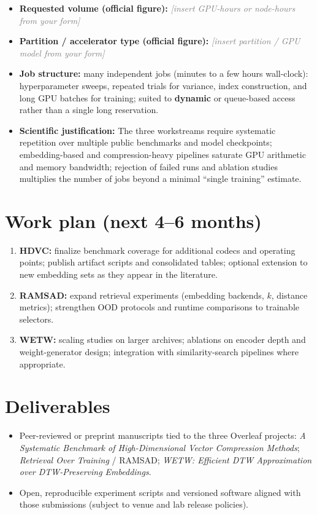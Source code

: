 \documentclass[11pt,a4paper]{article}
\newcommand{\AllocHours}{\textit{\textcolor{gray}{[insert GPU-hours or node-hours from your form]}}}
\newcommand{\AllocPartition}{\textit{\textcolor{gray}{[insert partition / GPU model from your form]}}}
\begin{document}
\begin{itemize}[leftmargin=*]
  \item \textbf{Requested volume (official figure):} \AllocHours
  \item \textbf{Partition / accelerator type (official figure):} \AllocPartition
  \item \textbf{Job structure:} many independent jobs (minutes to a few hours wall-clock): hyperparameter sweeps, repeated trials for variance, index construction, and long GPU batches for training; suited to \textbf{dynamic} or queue-based access rather than a single long reservation.
  \item \textbf{Scientific justification:} The three workstreams require systematic repetition over multiple public benchmarks and model checkpoints; embedding-based and compression-heavy pipelines saturate GPU arithmetic and memory bandwidth; rejection of failed runs and ablation studies multiplies the number of jobs beyond a minimal ``single training'' estimate.
\end{itemize}

\section{Work plan (next 4--6 months)}

\begin{enumerate}[leftmargin=*]
  \item \textbf{HDVC:} finalize benchmark coverage for additional codecs and operating points; publish artifact scripts and consolidated tables; optional extension to new embedding sets as they appear in the literature.
  \item \textbf{\textsc{RAMSAD}:} expand retrieval experiments (embedding backends, $k$, distance metrics); strengthen OOD protocols and runtime comparisons to trainable selectors.
  \item \textbf{\textsc{WETW}:} scaling studies on larger archives; ablations on encoder depth and weight-generator design; integration with similarity-search pipelines where appropriate.
\end{enumerate}

\section{Deliverables}

\begin{itemize}[leftmargin=*]
  \item Peer-reviewed or preprint manuscripts tied to the three Overleaf projects: \textit{A Systematic Benchmark of High-Dimensional Vector Compression Methods}; \textit{Retrieval Over Training} / \textsc{RAMSAD}; \textit{WETW: Efficient DTW Approximation over DTW-Preserving Embeddings}.
  \item Open, reproducible experiment scripts and versioned software aligned with those submissions (subject to venue and lab release policies).
\end{itemize}
\end{document}
